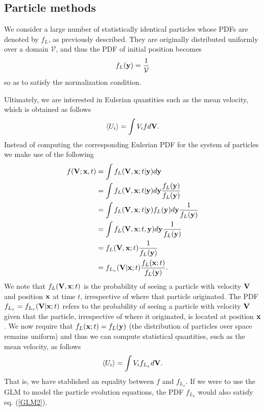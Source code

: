 \documentclass[oneside,a4paper,11pt]{report}
\newcommand{\uiavg}{\langle U_i \rangle}
\begin{document}
\subsection{Particle methods}
We consider a large number of statistically identical particles whose PDFs are denoted by  $f_L$, as previously described. They are originally distributed uniformly over a domain $\mathcal{V}$, and thus the PDF of initial position becomes
\begin{equation}
f_L(\mathbf{y}) = \frac{1}{\mathcal{V}}
\end{equation}
so as to satisfy the normalization condition.

Ultimately, we are interested in Eulerian quantities such as the mean velocity, which is obtained as follows
\begin{equation}
\uiavg = \int V_i f d\Vvec.
\end{equation}
Instead of computing the corresponding Eulerian PDF for the system of particles we make use of the following
\begin{align}
f(\mathbf{V}; \mathbf{x},t) &= \int f_L(\mathbf{V}, \mathbf{x}; t|\mathbf{y}) d\mathbf{y} \nonumber \\
& = \int f_L(\mathbf{V}, \mathbf{x}; t|\mathbf{y}) d\mathbf{y} \frac{f_L(\mathbf{y})}{f_L(\mathbf{y})} \nonumber \\
& = \int f_L(\mathbf{V}, \mathbf{x}; t| \mathbf{y}) f_L(\mathbf{y}) d\mathbf{y} \frac{1}{f_L(\mathbf{y})} \nonumber \\
& = \int f_L(\mathbf{V}, \mathbf{x}; t, \mathbf{y}) d\mathbf{y} \frac{1}{f_L(\mathbf{y})} \nonumber \\
& = f_L(\mathbf{V}, \mathbf{x}; t) \frac{1}{f_L(\mathbf{y})} \nonumber \\
& = f_{L_x}(\mathbf{V}| \mathbf{x}; t) \frac{f_L(\mathbf{x}; t)}{f_L(\mathbf{y})}.
\end{align}
We note that $f_L(\mathbf{V},\mathbf{x};t)$ is the probability of seeing a particle with velocity $\mathbf{V}$ and position $\mathbf{x}$ at time $t$, irrespective of where that particle originated. The PDF $f_{L_x} = f_{L_x}(\mathbf{V}|\mathbf{x};t)$ refers to the probability of seeing a particle with velocity $\mathbf{V}$ given that the particle, irrespective of where it originated, is located at position $\mathbf{x}$. We now require that $f_L(\mathbf{x};t) = f_L(\mathbf{y})$ (the distribution of particles over space remains uniform) and thus we can compute statistical quantities, such as the mean velocity, as follows
\begin{equation}
\uiavg = \int V_i f_{L_x} d\Vvec.
\end{equation}
That is, we have stablished an equality between $f$ and $f_{L_x}$. If we were to use the GLM to model the particle evolution equations, the PDF $f_{L_x}$ would also satisfy eq. (\ref{GLM2}).
\end{document}
